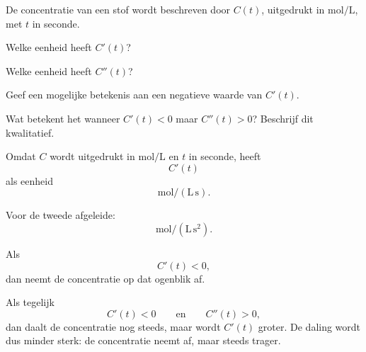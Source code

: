 \documentclass{ximera}
\begin{document}

\begin{oefening}{\oefU}

De concentratie van een stof wordt beschreven door $C(t)$,
uitgedrukt in $\mathrm{mol/L}$, met $t$ in seconde.

\begin{question}
Welke eenheid heeft $C'(t)$?
\end{question}

\begin{question}
Welke eenheid heeft $C''(t)$?
\end{question}

\begin{question}
Geef een mogelijke betekenis aan een negatieve waarde van $C'(t)$.
\end{question}

\begin{question}
Wat betekent het wanneer $C'(t)<0$ maar $C''(t)>0$?
Beschrijf dit kwalitatief.
\end{question}

\begin{oplossing}

Omdat $C$ wordt uitgedrukt in $\mathrm{mol/L}$ en $t$ in seconde, heeft
\[
C'(t)
\]
als eenheid
\[
\boxed{\mathrm{mol/(L\,s)}}.
\]

Voor de tweede afgeleide:
\[
\boxed{\mathrm{mol/(L\,s^2)}}.
\]

Als
\[
C'(t)<0,
\]
dan neemt de concentratie op dat ogenblik af.

Als tegelijk
\[
C'(t)<0
\qquad\text{en}\qquad
C''(t)>0,
\]
dan daalt de concentratie nog steeds, maar wordt $C'(t)$ groter.
De daling wordt dus minder sterk: de concentratie neemt af, maar steeds
trager.

\end{oplossing}

\end{oefening}





\end{document}
